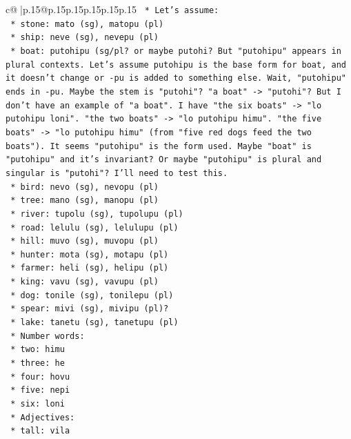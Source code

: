 \documentclass{article}
\begin{document}
{\begin{supertabular}{c@{$\;$}|p{.15\linewidth}@{}p{.15\linewidth}p{.15\linewidth}p{.15\linewidth}p{.15\linewidth}p{.15\linewidth}}
{{{\texttt{    *   Let's assume:} \\
\texttt{        *   stone: mato (sg), matopu (pl)} \\
\texttt{        *   ship: neve (sg), nevepu (pl)} \\
\texttt{        *   boat: putohipu (sg/pl? or maybe putohi? But "putohipu" appears in plural contexts. Let's assume putohipu is the base form for boat, and it doesn't change or {-}pu is added to something else. Wait, "putohipu" ends in {-}pu. Maybe the stem is "putohi"? "a boat" {-}> "putohi"? But I don't have an example of "a boat". I have "the six boats" {-}> "lo putohipu loni". "the two boats" {-}> "lo putohipu himu". "the five boats" {-}> "lo putohipu himu" (from "five red dogs feed the two boats"). It seems "putohipu" is the form used. Maybe "boat" is "putohipu" and it's invariant? Or maybe "putohipu" is plural and singular is "putohi"? I'll need to test this.} \\
\texttt{        *   bird: nevo (sg), nevopu (pl)} \\
\texttt{        *   tree: mano (sg), manopu (pl)} \\
\texttt{        *   river: tupolu (sg), tupolupu (pl)} \\
\texttt{        *   road: lelulu (sg), lelulupu (pl)} \\
\texttt{        *   hill: muvo (sg), muvopu (pl)} \\
\texttt{        *   hunter: mota (sg), motapu (pl)} \\
\texttt{        *   farmer: heli (sg), helipu (pl)} \\
\texttt{        *   king: vavu (sg), vavupu (pl)} \\
\texttt{        *   dog: tonile (sg), tonilepu (pl)} \\
\texttt{        *   spear: mivi (sg), mivipu (pl)?} \\
\texttt{        *   lake: tanetu (sg), tanetupu (pl)} \\
\texttt{        *   Number words:} \\
\texttt{            *   two: himu} \\
\texttt{            *   three: he} \\
\texttt{            *   four: hovu} \\
\texttt{            *   five: nepi} \\
\texttt{            *   six: loni} \\
\texttt{        *   Adjectives:} \\
\texttt{            *   tall: vila} \\
}}}
\end{supertabular}}
\end{document}
